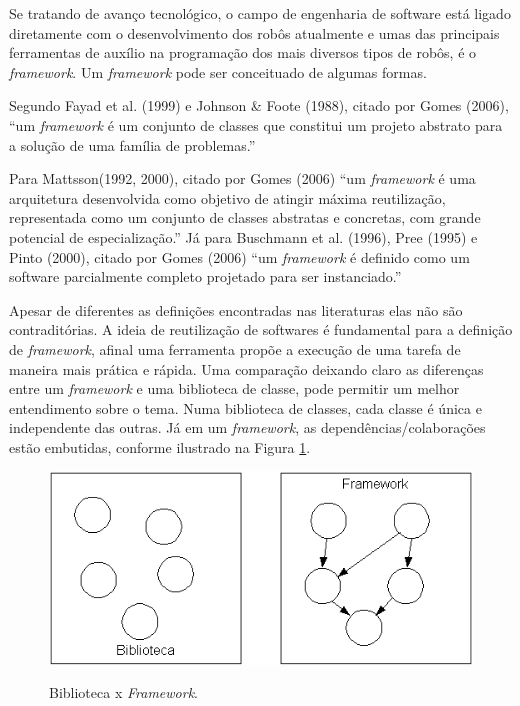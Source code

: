 Se tratando de avanço tecnológico, o campo de engenharia de software está ligado diretamente com o desenvolvimento dos robôs atualmente e umas das principais ferramentas de auxílio na programação dos mais diversos tipos de robôs, é o \textit{framework}. Um \textit{framework} pode ser conceituado de algumas formas.

Segundo Fayad et al. (1999) e Johnson \& Foote (1988), citado por Gomes (2006), “um \textit{framework }é um conjunto de classes que constitui um projeto abstrato para a solução de uma família de problemas.”

Para Mattsson(1992, 2000), citado por Gomes (2006) “um \textit{framework} é uma arquitetura desenvolvida como objetivo de atingir máxima reutilização, representada como um conjunto de classes abstratas e concretas, com grande potencial de especialização.”
Já para Buschmann et al. (1996), Pree (1995) e Pinto (2000), citado por Gomes (2006) “um \textit{framework }é definido como um software parcialmente completo projetado para ser instanciado.”

Apesar de diferentes as definições encontradas nas literaturas elas não são contraditórias. A ideia de reutilização de softwares é fundamental para a definição de \textit{framework}, afinal uma ferramenta propõe a execução de uma tarefa de maneira mais prática e rápida. Uma comparação deixando claro as diferenças entre um \textit{framework }e uma biblioteca de classe, pode permitir um melhor entendimento sobre o tema. Numa biblioteca de classes, cada classe é única e independente das outras. Já em um \textit{framework}, as dependências/colaborações estão embutidas, conforme ilustrado na Figura \ref{fig:biblioteca_vs_framework}.

\begin{figure}[H]
	\centering
	\caption{Biblioteca x \textit{Framework}.}
	\includegraphics[width=1\textwidth]
	{Figures/biblioteca_vs_framework}
	\label{fig:biblioteca_vs_framework}
\end{figure}

